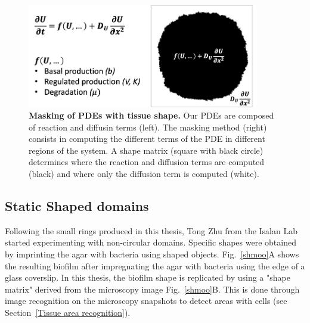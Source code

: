 \begin{figure}[H]
    \centering

    \includegraphics[width=0.9\textwidth]{chapters/Chapter 3/mask}
    \caption{\textbf{Masking of PDEs with tissue shape.} Our PDEs are composed of reaction and diffusin terms (left). The masking method (right) consists in computing the different terms of the PDE in different regions of the system. A shape matrix (square with black circle) determines where the reaction and diffusion terms are computed (black) and where only the diffusion term is computed (white).}
    \label{mask}
\end{figure}

\subsection{Static Shaped domains}
Following the small rings produced in this thesis, Tong Zhu from the Isalan Lab started experimenting with non-circular domains.
Specific shapes were obtained by imprinting the agar with bacteria using shaped objects.
Fig.~\ref{shmoo}A shows the resulting biofilm after impregnating the agar with bacteria using the edge of a glass coverslip. %
In this thesis, the biofilm shape is replicated by using a "shape matrix" derived from the microscopy image Fig.~\ref{shmoo}B.
This is done through image recognition on the microscopy snapshots to detect areas with cells (see Section~\ref{Tissue area recognition}).


